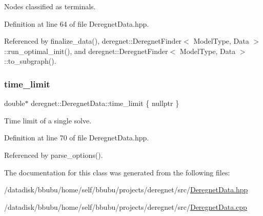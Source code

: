 Nodes classified as \textquotesingle{}terminals\textquotesingle{}. 



Definition at line 64 of file Deregnet\+Data.\+hpp.



Referenced by finalize\+\_\+data(), deregnet\+::\+Deregnet\+Finder$<$ Model\+Type, Data $>$\+::run\+\_\+optimal\+\_\+init(), and deregnet\+::\+Deregnet\+Finder$<$ Model\+Type, Data $>$\+::to\+\_\+subgraph().

\mbox{\label{classderegnet_1_1DeregnetData_ac378faf7e8466135b8dc0ced907d98ae}} 
\subsubsection{\texorpdfstring{time\+\_\+limit}{time\_limit}}
{\footnotesize\ttfamily double$\ast$ deregnet\+::\+Deregnet\+Data\+::time\+\_\+limit \{ nullptr \}}



Time limit of a single solve. 



Definition at line 70 of file Deregnet\+Data.\+hpp.



Referenced by parse\+\_\+options().



The documentation for this class was generated from the following files\+:\begin{DoxyCompactItemize}
\item 
/datadisk/bbubu/home/self/bbubu/projects/deregnet/src/\hyperlink{DeregnetData_8hpp}{Deregnet\+Data.\+hpp}\item 
/datadisk/bbubu/home/self/bbubu/projects/deregnet/src/\hyperlink{DeregnetData_8cpp}{Deregnet\+Data.\+cpp}\end{DoxyCompactItemize}
